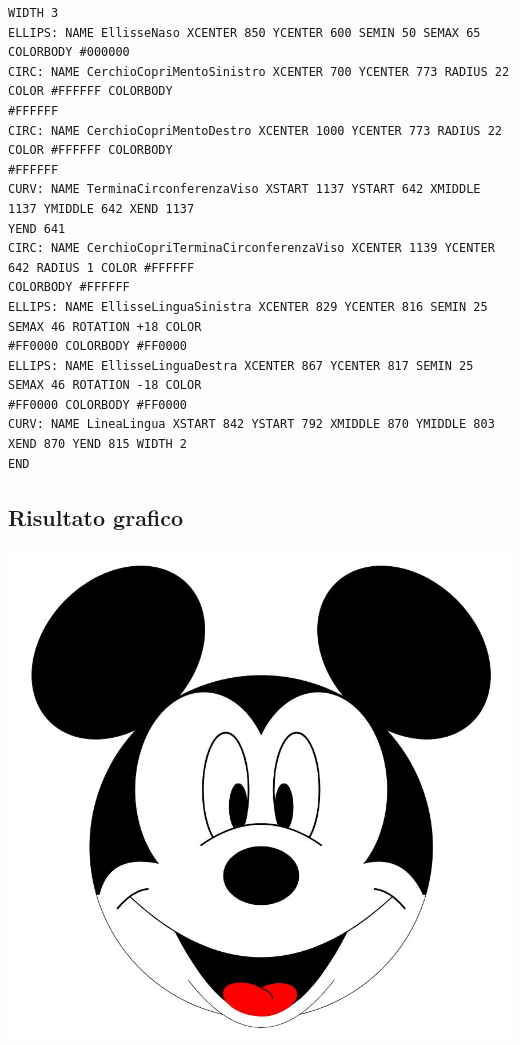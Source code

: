 \documentclass[a4paper]{article}
\begin{document}
\begin{verbatim}
WIDTH 3
ELLIPS: NAME EllisseNaso XCENTER 850 YCENTER 600 SEMIN 50 SEMAX 65 COLORBODY #000000
CIRC: NAME CerchioCopriMentoSinistro XCENTER 700 YCENTER 773 RADIUS 22 COLOR #FFFFFF COLORBODY
#FFFFFF
CIRC: NAME CerchioCopriMentoDestro XCENTER 1000 YCENTER 773 RADIUS 22 COLOR #FFFFFF COLORBODY
#FFFFFF
CURV: NAME TerminaCirconferenzaViso XSTART 1137 YSTART 642 XMIDDLE 1137 YMIDDLE 642 XEND 1137
YEND 641
CIRC: NAME CerchioCopriTerminaCirconferenzaViso XCENTER 1139 YCENTER 642 RADIUS 1 COLOR #FFFFFF
COLORBODY #FFFFFF
ELLIPS: NAME EllisseLinguaSinistra XCENTER 829 YCENTER 816 SEMIN 25 SEMAX 46 ROTATION +18 COLOR
#FF0000 COLORBODY #FF0000
ELLIPS: NAME EllisseLinguaDestra XCENTER 867 YCENTER 817 SEMIN 25 SEMAX 46 ROTATION -18 COLOR
#FF0000 COLORBODY #FF0000
CURV: NAME LineaLingua XSTART 842 YSTART 792 XMIDDLE 870 YMIDDLE 803 XEND 870 YEND 815 WIDTH 2
END
\end{verbatim}

\newpage

\subsection{Risultato grafico}
\includegraphics[scale=0.76]{Topolino.JPG} 
\end{document}
